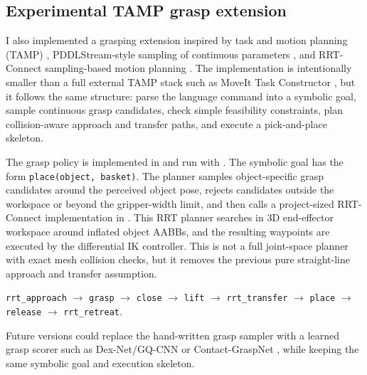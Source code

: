 \documentclass{article}
\begin{document}
\subsection{Experimental TAMP grasp extension}

I also implemented a grasping extension inspired by task and motion planning (TAMP) \cite{garrett2021tamp}, PDDLStream-style sampling of continuous parameters \cite{garrett2020pddlstream}, and RRT-Connect sampling-based motion planning \cite{kuffner2000rrtconnect}. The implementation is intentionally smaller than a full external TAMP stack such as MoveIt Task Constructor \cite{moveitmtc}, but it follows the same structure: parse the language command into a symbolic goal, sample continuous grasp candidates, check simple feasibility constraints, plan collision-aware approach and transfer paths, and execute a pick-and-place skeleton.

The grasp policy is implemented in  and run with . The symbolic goal has the form \texttt{place(object, basket)}. The planner samples object-specific grasp candidates around the perceived object pose, rejects candidates outside the workspace or beyond the gripper-width limit, and then calls a project-sized RRT-Connect implementation in . This RRT planner searches in 3D end-effector workspace around inflated object AABBs, and the resulting waypoints are executed by the differential IK controller. This is not a full joint-space planner with exact mesh collision checks, but it removes the previous pure straight-line approach and transfer assumption.

\begin{center}
\texttt{rrt\_approach} $\rightarrow$ \texttt{grasp} $\rightarrow$ \texttt{close} $\rightarrow$ \texttt{lift} $\rightarrow$ \texttt{rrt\_transfer} $\rightarrow$ \texttt{place} $\rightarrow$ \texttt{release} $\rightarrow$ \texttt{rrt\_retreat}.
\end{center}

Future versions could replace the hand-written grasp sampler with a learned grasp scorer such as Dex-Net/GQ-CNN \cite{dexnet2} or Contact-GraspNet \cite{contactgraspnet}, while keeping the same symbolic goal and execution skeleton.
\end{document}
